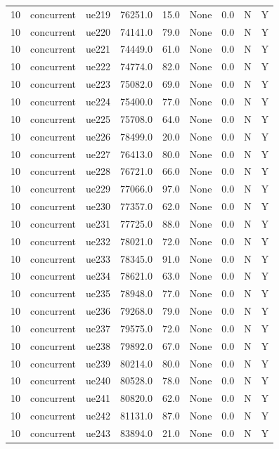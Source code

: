 \begin{table}[ht]
\begin{tabular}{|c|c|c|c|c|c|c|c|c|}
10 & concurrent & ue219 & 76251.0 & 15.0 & None & 0.0 & N & Y \\
10 & concurrent & ue220 & 74141.0 & 79.0 & None & 0.0 & N & Y \\
10 & concurrent & ue221 & 74449.0 & 61.0 & None & 0.0 & N & Y \\
10 & concurrent & ue222 & 74774.0 & 82.0 & None & 0.0 & N & Y \\
10 & concurrent & ue223 & 75082.0 & 69.0 & None & 0.0 & N & Y \\
10 & concurrent & ue224 & 75400.0 & 77.0 & None & 0.0 & N & Y \\
10 & concurrent & ue225 & 75708.0 & 64.0 & None & 0.0 & N & Y \\
10 & concurrent & ue226 & 78499.0 & 20.0 & None & 0.0 & N & Y \\
10 & concurrent & ue227 & 76413.0 & 80.0 & None & 0.0 & N & Y \\
10 & concurrent & ue228 & 76721.0 & 66.0 & None & 0.0 & N & Y \\
10 & concurrent & ue229 & 77066.0 & 97.0 & None & 0.0 & N & Y \\
10 & concurrent & ue230 & 77357.0 & 62.0 & None & 0.0 & N & Y \\
10 & concurrent & ue231 & 77725.0 & 88.0 & None & 0.0 & N & Y \\
10 & concurrent & ue232 & 78021.0 & 72.0 & None & 0.0 & N & Y \\
10 & concurrent & ue233 & 78345.0 & 91.0 & None & 0.0 & N & Y \\
10 & concurrent & ue234 & 78621.0 & 63.0 & None & 0.0 & N & Y \\
10 & concurrent & ue235 & 78948.0 & 77.0 & None & 0.0 & N & Y \\
10 & concurrent & ue236 & 79268.0 & 79.0 & None & 0.0 & N & Y \\
10 & concurrent & ue237 & 79575.0 & 72.0 & None & 0.0 & N & Y \\
10 & concurrent & ue238 & 79892.0 & 67.0 & None & 0.0 & N & Y \\
10 & concurrent & ue239 & 80214.0 & 80.0 & None & 0.0 & N & Y \\
10 & concurrent & ue240 & 80528.0 & 78.0 & None & 0.0 & N & Y \\
10 & concurrent & ue241 & 80820.0 & 62.0 & None & 0.0 & N & Y \\
10 & concurrent & ue242 & 81131.0 & 87.0 & None & 0.0 & N & Y \\
10 & concurrent & ue243 & 83894.0 & 21.0 & None & 0.0 & N & Y \\

\end{tabular}
\end{table}
